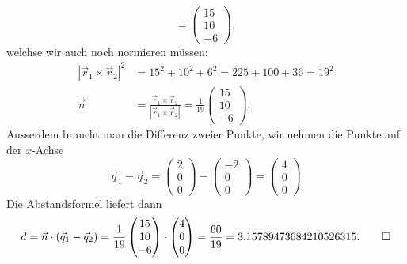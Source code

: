 \begin{loesung}
\[=
\begin{pmatrix}
15\\10\\ -6
\end{pmatrix},
\]
welchse wir auch noch normieren müssen:
\begin{align*}
|\vec r_1\times\vec r_2|^2
&=15^2+10^2+6^2=225+100+36=19^2
\\
\vec n&=
\frac{\vec r_1\times\vec r_2}{|\vec r_1\times\vec r_2|}=
\frac1{19}
\begin{pmatrix}
15\\10\\ -6
\end{pmatrix}.
\end{align*}
Ausserdem braucht man die Differenz zweier Punkte,
wir nehmen die Punkte auf der $x$-Achse
\[
\vec q_1-\vec q_2
=
\begin{pmatrix}2\\0\\0\end{pmatrix}
-
\begin{pmatrix}-2\\0\\0\end{pmatrix}
=
\begin{pmatrix}4\\0\\0\end{pmatrix}
\]
Die Abstandsformel liefert dann
\[
d=\vec n\cdot (\vec q_1-\vec q_2)=
\frac1{19}
\begin{pmatrix}
15\\10\\ -6
\end{pmatrix}
\cdot
\begin{pmatrix}4\\0\\0\end{pmatrix}
=\frac{60}{19}
=
3.15789473684210526315.
\qedhere
\]
\end{loesung}

